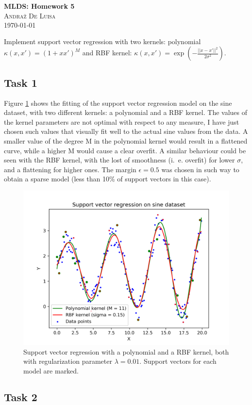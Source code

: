 \documentclass[twocolumn]{article}
\begin{document}
\begin{center}

\Large{\textbf{MLDS: Homework 5}} \\
\textsc{\large{Andraž De Luisa}} \\
\vspace{6pt}
\small{\today}

\end{center}

Implement support vector regression with two kernels: polynomial $\kappa (x, x') = (1 + x x')^M $ and RBF kernel: $\kappa (x, x') = \exp(- \frac{||x - x'||^2}{2 \sigma^2})$.

\subsection*{Task 1}

Figure \ref{fig:sine} shows the fitting of the support vector regression model on the sine dataset, with two different kernels: a polynomial and a RBF kernel. The values of the kernel parameters are not optimal with respect to any measure, I have just chosen such values that visually fit well to the actual sine values from the data. A smaller value of the degree M in the polynomial kernel would result in a flattened curve, while a higher M would cause a clear overfit. A similar behaviour could be seen with the RBF kernel, with the lost of smoothness (i.\ e. overfit) for lower $\sigma$, and a flattening for higher ones. The margin $\epsilon = 0.5$ was chosen in such way to obtain a sparse model (less than 10\% of support vectors in this case).

\begin{figure}[ht]
    \centering
    \includegraphics[width=.4\textwidth]{sine.png}
    \caption{Support vector regression with a polynomial and a RBF kernel, both with regularization parameter $\lambda = 0.01$. Support vectors for each model are marked.}
    \label{fig:sine}
\end{figure}

\subsection*{Task 2}
\end{document}
